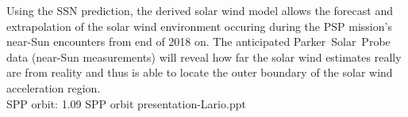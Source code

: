 Using the SSN prediction, the derived solar wind model allows the forecast and extrapolation of the solar wind environment occuring during the PSP mission's near-Sun encounters from end of 2018 on. The anticipated Parker~Solar~Probe data (near-Sun measurements) will reveal how far the solar wind estimates really are from reality and thus is able to locate the outer boundary of the solar wind acceleration region.\\


SPP orbit:	1.09 SPP orbit presentation-Lario.ppt\\




